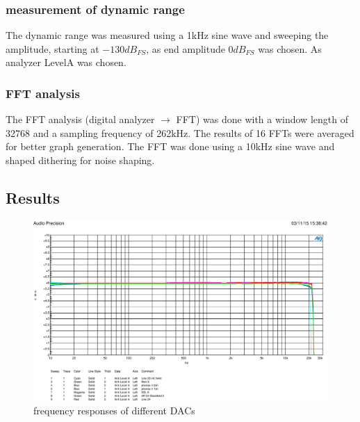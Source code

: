 \documentclass[11pt]{report}
\begin{document}
\subsubsection{measurement of dynamic range}
The dynamic range was measured using a 1kHz sine wave and sweeping the amplitude, starting at $-130dB_{FS}$, as end amplitude $0dB_{FS}$ was chosen. As analyzer LevelA was chosen.
\subsubsection{FFT analysis}
The FFT analysis (digital analyzer $\rightarrow$ FFT) was done with a window length of 32768 and a sampling frequency of 262kHz. The results of 16 FFTs were averaged for better graph generation. The FFT was done using a 10kHz sine wave and shaped dithering for noise shaping.

	\subsection{Results}

\begin{figure}[htbp]
\begin{center}
\includegraphics[width=14cm,keepaspectratio=true]{DAWandlerVergleich10dB}
\caption{frequency responses of different DACs}
\label{Abb.:1}
\end{center}
\end{figure}
\end{document}
